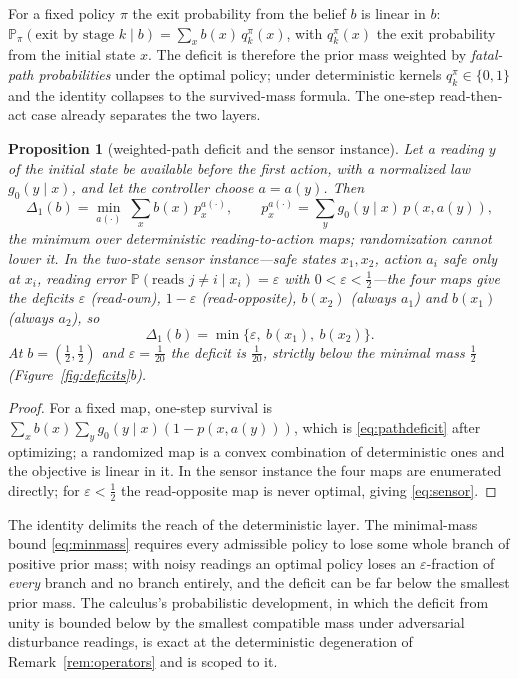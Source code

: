 \documentclass[11pt,a4paper]{article}
\theoremstyle{plain}
\newtheorem{proposition}[theorem]{Proposition}
\theoremstyle{definition}
\theoremstyle{remark}
\newcommand{\Prob}{\mathbb{P}}
\newcommand{\tfr}[2]{\tfrac{#1}{#2}}
\begin{document}
For a fixed policy $\pi$ the exit probability from the belief $b$ is linear in $b$: $\Prob_\pi(\text{exit by stage }k\mid b)=\sum_x b(x)\,q^{\pi}_k(x)$, with $q^{\pi}_k(x)$ the exit probability from the initial state $x$. The deficit is therefore the prior mass weighted by \emph{fatal-path probabilities} under the optimal policy; under deterministic kernels $q^{\pi}_k\in\{0,1\}$ and the identity collapses to the survived-mass formula. The one-step read-then-act case already separates the two layers.

\begin{proposition}[weighted-path deficit and the sensor instance]\label{prop:pathdeficit}
Let a reading $y$ of the initial state be available before the first action, with a normalized law $g_0(y\mid x)$, and let the controller choose $a=a(y)$. Then
\begin{equation}\label{eq:pathdeficit}
\Delta_1(b)=\min_{a(\cdot)}\ \sum_{x}b(x)\,p^{a(\cdot)}_x,\qquad p^{a(\cdot)}_x=\sum_y g_0(y\mid x)\,p(x,a(y)),
\end{equation}
the minimum over deterministic reading-to-action maps; randomization cannot lower it. In the two-state sensor instance---safe states $x_1,x_2$, action $a_i$ safe only at $x_i$, reading error $\Prob(\text{reads }j\neq i\mid x_i)=\varepsilon$ with $0<\varepsilon<\tfr12$---the four maps give the deficits $\varepsilon$ (read-own), $1-\varepsilon$ (read-opposite), $b(x_2)$ (always $a_1$) and $b(x_1)$ (always $a_2$), so
\begin{equation}\label{eq:sensor}
\Delta_1(b)=\min\{\varepsilon,\ b(x_1),\ b(x_2)\}.
\end{equation}
At $b=(\tfr12,\tfr12)$ and $\varepsilon=\tfr1{20}$ the deficit is $\tfr1{20}$, strictly below the minimal mass $\tfr12$ (Figure~\ref{fig:deficits}b).
\end{proposition}

\begin{proof}
For a fixed map, one-step survival is $\sum_x b(x)\sum_y g_0(y\mid x)(1-p(x,a(y)))$, which is \eqref{eq:pathdeficit} after optimizing; a randomized map is a convex combination of deterministic ones and the objective is linear in it. In the sensor instance the four maps are enumerated directly; for $\varepsilon<\tfr12$ the read-opposite map is never optimal, giving \eqref{eq:sensor}.
\end{proof}

The identity delimits the reach of the deterministic layer. The minimal-mass bound \eqref{eq:minmass} requires every admissible policy to lose some whole branch of positive prior mass; with noisy readings an optimal policy loses an $\varepsilon$-fraction of \emph{every} branch and no branch entirely, and the deficit can be far below the smallest prior mass. The calculus's probabilistic development, in which the deficit from unity is bounded below by the smallest compatible mass under adversarial disturbance readings, is exact at the deterministic degeneration of Remark~\ref{rem:operators} and is scoped to it.
\end{document}
